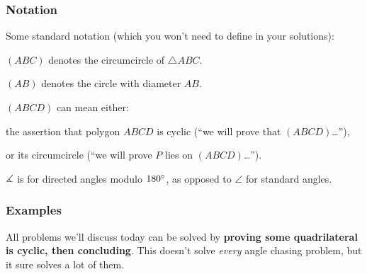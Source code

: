 \documentclass[11pt,paper=letter]{scrartcl}
\begin{document}
\subsubsection*{Notation}

Some standard notation (which you won't need to define in your solutions):

\begin{itemthin}
\item $(ABC)$ denotes the circumcircle of $\triangle ABC$.
\item $(AB)$ denotes the circle with diameter $AB$.
\item $(ABCD)$ can mean either:
\vspace{-0.5em}
\begin{itemthin}
\item the assertion that polygon $ABCD$ is cyclic (``we will prove that $(ABCD)$\dots''),
\item or its circumcircle (``we will prove $P$ lies on $(ABCD)$\dots'').
\end{itemthin}
\item $\measuredangle$ is for directed angles modulo $180^\circ$, as opposed to $\angle$ for standard angles.
\end{itemthin}

\subsubsection*{Examples}

All problems we'll discuss today can be solved by \textbf{proving some quadrilateral is cyclic, then concluding}. This doesn't solve \textit{every} angle chasing problem, but it sure solves a lot of them.
\end{document}
